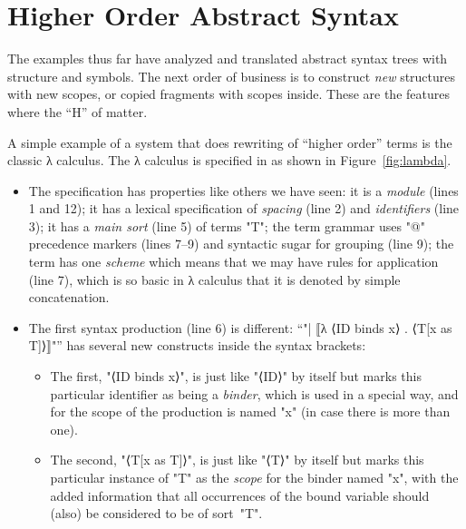 \documentclass[12pt]{article} %
\begin{document}
\section{Higher Order Abstract Syntax}
\label{sec:hoas}

The examples thus far have analyzed and translated abstract syntax trees with structure and
symbols. The next order of business is to construct \emph{new} structures with new scopes, or copied
fragments with scopes inside. These are the features where the ``H'' of \HAX matter.

\begin{example}
  A simple example of a system that does rewriting of ``higher order'' terms is the classic λ
  calculus. The λ calculus is specified in \HAX as shown in Figure~\ref{fig:lambda}.
  \begin{itemize}

  \item The specification has properties like others we have seen: it is a \emph{module} (lines 1
    and 12); it has a lexical specification of \emph{spacing} (line 2) and \emph{identifiers} (line
    3); it has a \emph{main sort} (line 5) of terms "T"; the term grammar uses "@" precedence
    markers (lines 7--9) and syntactic sugar for grouping (line 9); the term has one \emph{scheme}
    which means that we may have rules for application (line 7), which is so basic in λ calculus
    that it is denoted by simple concatenation.

  \item The first syntax production (line 6) is different:
    ``"| ⟦λ ⟨ID binds x⟩ . ⟨T[x as T]⟩⟧"''
    has several new constructs inside the syntax brackets:
    \begin{itemize}

    \item The first, "⟨ID binds x⟩", is just like "⟨ID⟩" by itself but marks this particular
      identifier as being a \emph{binder}, which is used in a special way, and for the scope of the
      production is named "x" (in case there is more than one).

    \item The second, "⟨T[x as T]⟩", is just like "⟨T⟩" by itself but marks this particular instance
      of "T" as the \emph{scope} for the binder named "x", with the added information that all
      occurrences of the bound variable should (also) be considered to be of sort~"T".

    \end{itemize}


\end{itemize}
\end{example}
\end{document}
